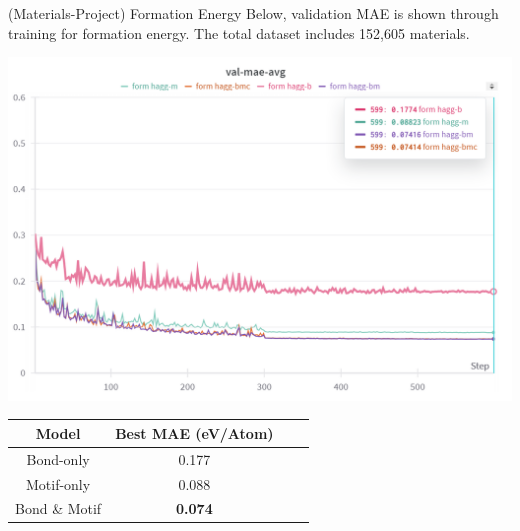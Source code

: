 \documentclass[11pt]{beamer}
\begin{document}
\begin{frame}{(Materials-Project) Formation Energy}\small
Below, validation MAE is shown through training for formation energy. The total dataset includes 152,605 materials.
\begin{center}

\includegraphics[scale=0.4]{formation_energy.png}

\medskip

\medskip


\begin{tabular}{c|ccc}
Model & Best MAE (eV/Atom) \\
\hline
Bond-only & 0.177 \\
Motif-only &  0.088 \\
Bond \& Motif &  \textbf{0.074} \\
\end{tabular}
\end{center}
\end{frame}
\end{document}
